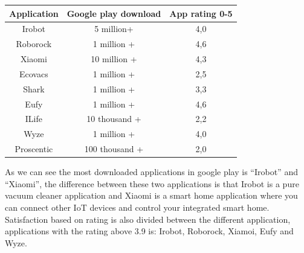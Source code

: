 \begin{table}[]
\begin{tabular}{|c|c|c|}
\hline
Application & Google play download & App rating 0-5 \\ \hline
Irobot      & 5 million+           & 4,0            \\ \hline
Roborock    & 1 million +          & 4,6            \\ \hline
Xiaomi      & 10 million +         & 4,3            \\ \hline
Ecovacs     & 1 million +          & 2,5            \\ \hline
Shark       & 1 million +          & 3,3            \\ \hline
Eufy        & 1 million +          & 4,6            \\ \hline
ILife       & 10 thousand +        & 2,2            \\ \hline
Wyze        & 1 million +          & 4,0            \\ \hline
Proscentic  & 100 thousand +       & 2,0            \\ \hline
\end{tabular}
\end{table}

As we can see the most downloaded applications in google play is “Irobot” and “Xiaomi”, the difference between these two applications is that Irobot is a pure vacuum cleaner application and Xiaomi is a smart home application where you can connect other IoT devices and control your integrated smart home.  
Satisfaction based on rating is also divided between the different application, applications with the rating above 3.9 is: Irobot, Roborock, Xiamoi, Eufy and Wyze. 

